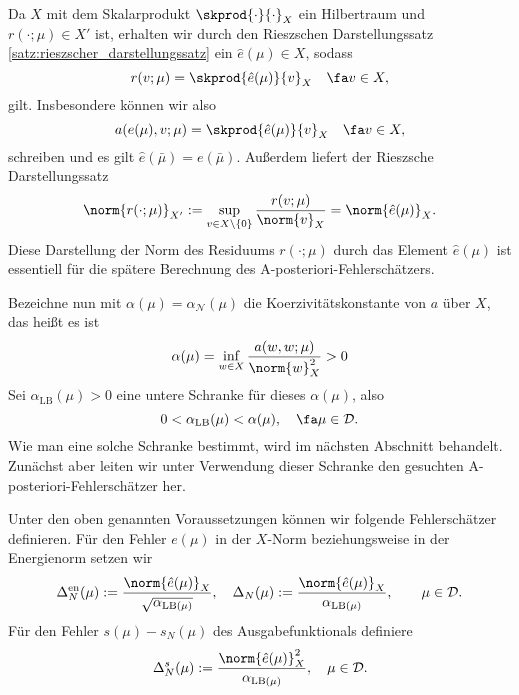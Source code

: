 Da $X$ mit dem Skalarprodukt $\skprod{\cdot}{\cdot}_X$ ein Hilbertraum und $r(\cdot; \mu) \in X'$ ist, erhalten wir durch den Rieszschen Darstellungssatz \ref{satz:rieszscher_darstellungssatz} ein $\hat e(\mu) \in X$, sodass
\begin{equation}
    \label{eq:residuum_riesz}
    r(v; \mu) = \skprod{\hat e(\mu)}{v}_X \quad \fa v \in X,
\end{equation}
gilt.
Insbesondere können wir also
\begin{equation}
    \label{eq:a_von_e_gl_skprod_e}
    a(e(\mu), v; \mu) = \skprod{\hat e(\mu)}{v}_X \quad \fa v \in X,
\end{equation}
schreiben und es gilt $\hat e(\bar \mu) = e(\bar \mu)$.
Außerdem liefert der Rieszsche Darstellungssatz
\begin{equation}
    \label{eq:residuum_norm_gl_hat_e_norm}
    \norm{r(\cdot; \mu)}_{X'} := \sup_{v \in X \setminus \left\{ 0 \right\}} \frac{r(v; \mu)}{\norm{v}_X} = \norm{\hat e(\mu)}_X.
\end{equation}
Diese Darstellung der Norm des Residuums $r(\cdot; \mu)$ durch das Element $\hat e(\mu)$ ist essentiell für die spätere Berechnung des A-posteriori-Fehlerschätzers.

Bezeichne nun mit $\alpha(\mu) = \alpha_{\mathcal N}(\mu)$ die Koerzivitätskonstante von $a$ über $X$, das heißt es ist
\begin{equation}
            \alpha(\mu) = \inf_{w \in X} \frac{a(w, w; \mu)}{\norm{w}^2_X} > 0
\end{equation}
Sei $\alpha_{\text{LB}}(\mu) > 0$ eine untere Schranke für dieses $\alpha(\mu)$, also
\begin{equation}
    \label{eq:alpha_lb}
    0 < \alpha_{\text{LB}}(\mu) < \alpha(\mu), \quad \fa \mu \in \mathcal D.
\end{equation}
Wie man eine solche Schranke bestimmt, wird im nächsten Abschnitt behandelt.
Zunächst aber leiten wir unter Verwendung dieser Schranke den gesuchten A-posteriori-Fehlerschätzer her.

\begin{Definition}
    Unter den oben genannten Voraussetzungen können wir folgende Fehlerschätzer definieren.
    Für den Fehler $e(\mu)$ in der $X$-Norm beziehungsweise in der Energienorm setzen wir
    \begin{equation}
        \Delta^{\text{en}}_N(\mu) := \frac{\norm{\hat e(\mu)}_X}{\sqrt{\alpha_{\text{LB}(\mu)}}}
        , \quad
        \Delta_N(\mu) := \frac{\norm{\hat e(\mu)}_X}{\alpha_{\text{LB}(\mu)}}
        , \qquad \mu \in \mathcal D.
    \end{equation}
    Für den Fehler $s(\mu) - s_N(\mu)$ des Ausgabefunktionals definiere
    \begin{equation}
        \Delta^s_N(\mu) := \frac{\norm{\hat e(\mu)}_X^2}{\alpha_{\text{LB}(\mu)}}, \quad \mu \in \mathcal D.
    \end{equation}
\end{Definition}

